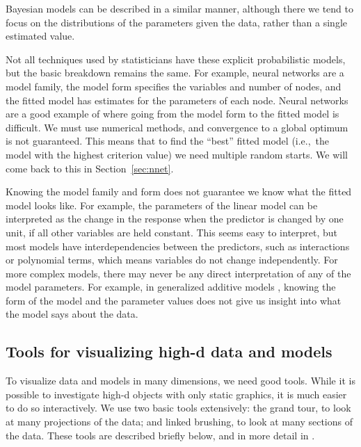 \documentclass[preprint]{imsart}
\begin{document}
Bayesian models can be described in a similar manner, although there we tend to focus on the distributions of the parameters given the data, rather than a single estimated value.

Not all techniques used by statisticians have these explicit probabilistic models, but the basic breakdown remains the same.  For example, neural networks are a model family, the model form specifies the variables and number of nodes, and the fitted model has estimates for the parameters of each node.  Neural networks are a good example of where going from the model form to the fitted model is difficult.  We must use numerical methods, and convergence to a global optimum is not guaranteed.  This means that to find the ``best'' fitted model (i.e.,\ the model with the highest criterion value) we need multiple random starts.  We will come back to this in Section~\ref{sec:nnet}.

Knowing the model family and form does not guarantee we know what the fitted model looks like.  For example, the parameters of the linear model can be interpreted as the change in the response when the predictor is changed by one unit, if all other variables are held constant.  This seems easy to interpret, but most models have interdependencies between the predictors, such as interactions or polynomial terms,  which means variables do not change independently.  For more complex models, there may never be any direct interpretation of any of the model parameters.  For example, in generalized additive models \citep{wood:2006}, knowing the form of the model and the parameter values does not give us insight into what the model says about the data.

\subsection{Tools for visualizing high-d data and models}

To visualize data and models in many dimensions, we need good tools. While it is possible to investigate high-d objects with only static graphics, it is much easier to do so interactively. We  use two basic tools extensively: the grand tour, to look at many projections of the data; and linked brushing, to look at many sections of the data. These tools are described briefly below, and in more detail in \citet{cook:2007}. %
\end{document}
